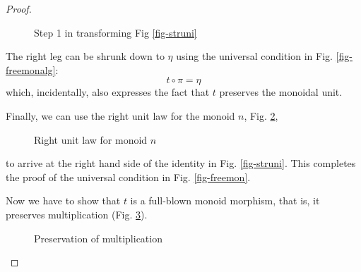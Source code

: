 \documentclass[letterpaper, 10 pt, conference]{ieeeconf}
\begin{document}
\begin{proof}
\begin{figure}[H]
\caption{Step 1 in transforming Fig \ref{fig-struni}}
\label{fig-}
\end{figure}

The right leg can be shrunk down to $\eta$ using the universal condition in Fig. \ref{fig-freemonalg}:
\[t \circ \pi = \eta\]
which, incidentally, also expresses the fact that $t$ preserves the monoidal unit.

Finally, we can use the right unit law for the monoid $n$, Fig. \ref{fig-runitn},

\begin{figure}[H]
\centering
{}
\caption{Right unit law for monoid $n$}
\label{fig-runitn}
\end{figure}
to arrive at the right hand side of the identity in Fig. \ref{fig-struni}. This completes the proof of the universal condition in Fig. \ref{fig-freemon}. 

Now we have to show that $t$ is a full-blown monoid morphism, that is, it preserves multiplication (Fig. \ref{fig-mul}).

\begin{figure}[H]
\centering
{}
\caption{Preservation of multiplication}
\label{fig-mul}
\end{figure}


\end{proof}
\end{document}

